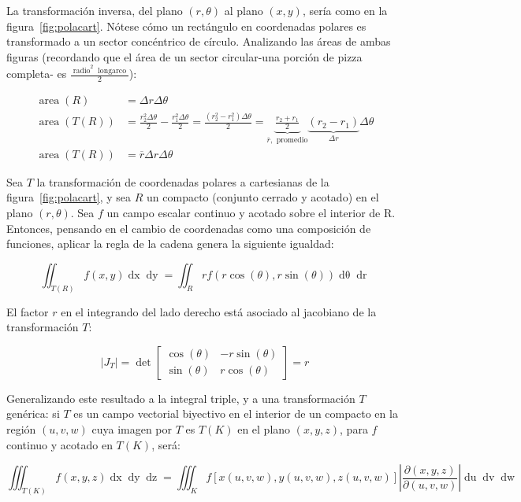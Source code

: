 \documentclass{article}
\begin{document}
La transformación inversa, del plano $(r, \theta)$ al plano $(x,y)$, sería como en la figura~\ref{fig:polacart}. Nótese cómo un rectángulo en coordenadas polares es transformado a un sector concéntrico de círculo. Analizando las áreas de ambas figuras (recordando que el área de un sector circular-una porción de pizza completa- es $ \frac{ \mathop{radio}^2 \mathop{longarco} }{2} $):

\begin{align}
\mathop{area}(R) &= \Delta r \Delta \theta \\
\mathop{area}(T(R)) &= \frac{r_2^2 \Delta \theta}{2} - \frac{r_1^2 \Delta \theta}{2} = \frac{(r_2^2 - r_1^2) \Delta \theta}{2} = \underbrace{ \frac{r_2 + r_1}{2} }_{\overline{r}, \text{ promedio}} \underbrace{ (r_2 - r_1) }_{\Delta r} \Delta \theta \\
\mathop{area}(T(R)) &= \overline{r} \Delta r \Delta \theta
\end{align}

Sea $T$ la transformación de coordenadas polares a cartesianas de la figura~\ref{fig:polacart}, y sea $R$ un compacto (conjunto cerrado y acotado) en el plano $(r,\theta)$. Sea $f$ un campo escalar continuo y acotado sobre el interior de R. Entonces, pensando en el cambio de coordenadas como una composición de funciones, aplicar la regla de la cadena genera la siguiente igualdad:

\begin{equation}
\iint_{T(R)} f(x,y) \mathop{dx} \mathop{dy} = \iint_R r f(r \cos(\theta), r \sin(\theta)) \mathop{d\theta} \mathop{dr}
\end{equation}

El factor $r$ en el integrando del lado derecho está asociado al jacobiano de la transformación $T$:

\begin{equation}
|J_T| = \det \begin{bmatrix}
\cos(\theta) & -r \sin(\theta) \\
\sin(\theta) & r \cos(\theta)
\end{bmatrix} = r
\end{equation}

Generalizando este resultado a la integral triple, y a una transformación $T$ genérica: si $T$ es un campo vectorial biyectivo en el interior de un compacto en la región $(u,v,w)$ cuya imagen por $T$ es $T(K)$ en el plano $(x,y,z)$, para $f$ continuo y acotado en $T(K)$, será:

\begin{equation}
\iiint_{T(K)} f(x,y,z) \mathop{dx} \mathop{dy} \mathop{dz} = \iiint_K f[x(u,v,w), y(u,v,w), z(u,v,w)] \left| \frac{\partial(x,y,z)}{\partial(u,v,w)} \right| \mathop{du} \mathop{dv} \mathop{dw}
\end{equation}
\end{document}
